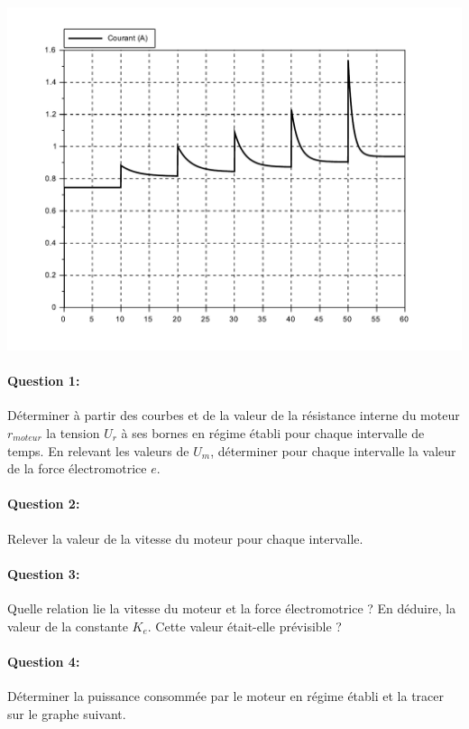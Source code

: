 \begin{center}
	\includegraphics[width=0.9\linewidth]{img/Courant}
\end{center}

\paragraph{Question 1:} Déterminer à partir des courbes et de la valeur de la résistance interne du moteur $r_{moteur}$ la tension $U_r$ à ses bornes en régime établi pour chaque intervalle de temps. En relevant les valeurs de $U_m$, déterminer pour chaque intervalle la valeur de la force électromotrice $e$.

\paragraph{Question 2:} Relever la valeur de la vitesse du moteur pour chaque intervalle.

\paragraph{Question 3:} Quelle relation lie la vitesse du moteur et la force électromotrice ? En déduire, la valeur de la constante $K_e$. Cette valeur était-elle prévisible ?

\paragraph{Question 4:} Déterminer la puissance consommée par le moteur en régime établi et la tracer sur le graphe suivant.

